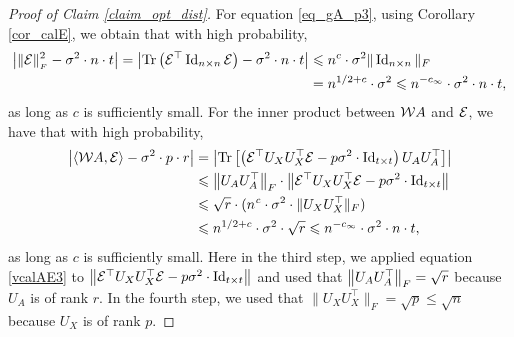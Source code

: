 \begin{proof}[Proof of Claim \ref{claim_opt_dist}]
	For equation \eqref{eq_gA_p3}, using Corollary \ref{cor_calE},
	we obtain that with high probability,
	\begin{align}
		\left\lvert\|\mathcal{E}\|_{_{F}}^2 - \sigma^2 \cdot n \cdot t\right\rvert=\left\lvert\operatorname{Tr}\left( \mathcal E^\top \operatorname{Id}_{n\times n}\mathcal E\right) - \sigma^2 \cdot n \cdot t\right\rvert &\leqslant n^{c} \cdot \sigma^2 \| \operatorname{Id}_{n\times n}\|_F \nonumber\\
		&= n^{1/2+c} \cdot \sigma^2 \leqslant n^{-c_{\infty}} \cdot \sigma^2 \cdot n \cdot t, \label{eq_gA_err3}
	\end{align}
	as long as $c$ is sufficiently small. 
	For the inner product between ${\mathcal W} A$ and $\mathcal{E}$, we have that with high probability,
	\begin{align}
		{\left| {\langle {\mathcal W}A, \mathcal{E}\rangle - \sigma^2\cdot p \cdot r } \right|} &= {\left| {\operatorname{Tr}\left[\left(\mathcal{E}^\top U_X U_X^{\top}\mathcal{E}  - p\sigma^2 \cdot  \operatorname{Id}_{t\times t} \right)  U_AU_A^{\top} \right]} \right|} \nonumber  \\
		&\leqslant \left\| U_{A} U_A^{\top} \right\|_{F} \cdot \left\| \mathcal{E}^\top U_X U_X^{\top} \mathcal{E} - p \sigma^2 \cdot  \operatorname{Id}_{t\times t} \right\| \nonumber \\
		&\leqslant \sqrt{r} \cdot (n^{{\mathit{c}}}\cdot \sigma^2\cdot \|U_X U_X^\top\|_F) \nonumber \\
		&\leqslant n^{1/2+c} \cdot \sigma^2 \cdot \sqrt{r}  \leqslant  n^{-c_{\infty}} \cdot \sigma^2 \cdot n \cdot t ,\label{eq_gA_err4}
	\end{align}
as long as $c$ is sufficiently small. Here in the third step, we applied equation \eqref{vcalAE3} to $\left\| \mathcal{E}^\top U_X U_X^{\top} \mathcal{E} - p \sigma^2 \cdot  \operatorname{Id}_{t\times t} \right\|$ and used that $ \left\| U_{A} U_A^{\top} \right\|_{F}=\sqrt{r}$ because $U_A$ is of rank $r$. In the fourth step, we used that $\|U_X U_X^\top\|_F=\sqrt{p}\le \sqrt{n}$ because $U_X$ is of rank $p$.


\end{proof}
